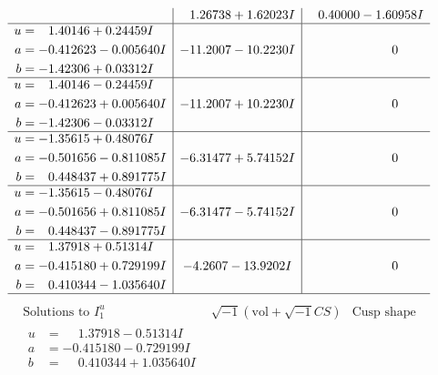 \documentclass[1p]{elsarticle_modified}
\theoremstyle{definition}
\newcommand{\I}{\sqrt{-1}}
\begin{document}
$$\begin{array}{c|c|c}
 & \phantom{-}1.26738 + 1.62023 I & \phantom{-}0.40000 - 1.60958 I \\ \hline\begin{aligned}
u &= \phantom{-}1.40146 + 0.24459 I \\
a &= -0.412623 - 0.005640 I \\
b &= -1.42306 + 0.03312 I\end{aligned}
 & -11.2007 - 10.2230 I & \phantom{-0.000000 } 0 \\ \hline\begin{aligned}
u &= \phantom{-}1.40146 - 0.24459 I \\
a &= -0.412623 + 0.005640 I \\
b &= -1.42306 - 0.03312 I\end{aligned}
 & -11.2007 + 10.2230 I & \phantom{-0.000000 } 0 \\ \hline\begin{aligned}
u &= -1.35615 + 0.48076 I \\
a &= -0.501656 - 0.811085 I \\
b &= \phantom{-}0.448437 + 0.891775 I\end{aligned}
 & -6.31477 + 5.74152 I & \phantom{-0.000000 } 0 \\ \hline\begin{aligned}
u &= -1.35615 - 0.48076 I \\
a &= -0.501656 + 0.811085 I \\
b &= \phantom{-}0.448437 - 0.891775 I\end{aligned}
 & -6.31477 - 5.74152 I & \phantom{-0.000000 } 0 \\ \hline\begin{aligned}
u &= \phantom{-}1.37918 + 0.51314 I \\
a &= -0.415180 + 0.729199 I \\
b &= \phantom{-}0.410344 - 1.035640 I\end{aligned}
 & -4.2607 - 13.9202 I & \phantom{-0.000000 } 0\\
 \hline 
 \end{array}$$\newpage$$\begin{array}{c|c|c}  
\text{Solutions to }I^u_{1}& \I (\text{vol} + \sqrt{-1}CS) & \text{Cusp shape}\\
 \hline 
\begin{aligned}
u &= \phantom{-}1.37918 - 0.51314 I \\
a &= -0.415180 - 0.729199 I \\
b &= \phantom{-}0.410344 + 1.035640 I\end{aligned}

\end{array}$$
\end{document}
